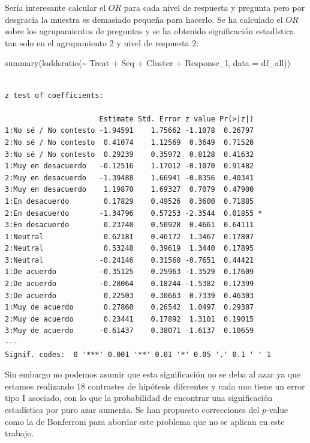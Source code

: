 \documentclass[
  12pt,
  a4paper,
  extrafontsizes,
  onecolumn,
  openright]{memoir}
\newenvironment{Shaded}{\begin{snugshade}}{\end{snugshade}}
\newcommand{\AttributeTok}[1]{\textcolor[rgb]{0.40,0.45,0.13}{#1}}
\newcommand{\FunctionTok}[1]{\textcolor[rgb]{0.28,0.35,0.67}{#1}}
\newcommand{\NormalTok}[1]{\textcolor[rgb]{0.00,0.23,0.31}{#1}}
\newcommand{\SpecialCharTok}[1]{\textcolor[rgb]{0.37,0.37,0.37}{#1}}
\begin{document}
Sería interesante calcular el \(OR\) para cada nivel de respuesta y
pregunta pero por desgracia la muestra es demasiado pequeña para
hacerlo. Se ha calculado el \(OR\) sobre los agrupamientos de preguntas
y se ha obtenido significación estadística tan solo en el agrupamiento 2
y nivel de respuesta 2:

\scriptsize

\begin{Shaded}
\begin{Highlighting}[]
\FunctionTok{summary}\NormalTok{(}\FunctionTok{loddsratio}\NormalTok{(}\SpecialCharTok{\textasciitilde{}}\NormalTok{ Treat }\SpecialCharTok{+}\NormalTok{ Seq }\SpecialCharTok{+}\NormalTok{ Cluster }\SpecialCharTok{+}\NormalTok{ Response\_l, }\AttributeTok{data =}\NormalTok{ df\_all))}
\end{Highlighting}
\end{Shaded}

\begin{verbatim}

z test of coefficients:

                      Estimate Std. Error z value Pr(>|z|)  
1:No sé / No contesto -1.94591    1.75662 -1.1078  0.26797  
2:No sé / No contesto  0.41074    1.12569  0.3649  0.71520  
3:No sé / No contesto  0.29239    0.35972  0.8128  0.41632  
1:Muy en desacuerdo   -0.12516    1.17012 -0.1070  0.91482  
2:Muy en desacuerdo   -1.39488    1.66941 -0.8356  0.40341  
3:Muy en desacuerdo    1.19870    1.69327  0.7079  0.47900  
1:En desacuerdo        0.17829    0.49526  0.3600  0.71885  
2:En desacuerdo       -1.34796    0.57253 -2.3544  0.01855 *
3:En desacuerdo        0.23740    0.50928  0.4661  0.64111  
1:Neutral              0.62181    0.46172  1.3467  0.17807  
2:Neutral              0.53248    0.39619  1.3440  0.17895  
3:Neutral             -0.24146    0.31560 -0.7651  0.44421  
1:De acuerdo          -0.35125    0.25963 -1.3529  0.17609  
2:De acuerdo          -0.28064    0.18244 -1.5382  0.12399  
3:De acuerdo           0.22503    0.30663  0.7339  0.46303  
1:Muy de acuerdo       0.27860    0.26542  1.0497  0.29387  
2:Muy de acuerdo       0.23441    0.17892  1.3101  0.19015  
3:Muy de acuerdo      -0.61437    0.38071 -1.6137  0.10659  
---
Signif. codes:  0 '***' 0.001 '**' 0.01 '*' 0.05 '.' 0.1 ' ' 1
\end{verbatim}

\normalsize

Sin embargo no podemos asumir que esta significación no se deba al azar
ya que estamos realizando 18 contrastes de hipótesis diferentes y cada
uno tiene un error tipo I asociado, con lo que la probabilidad de
encontrar una significación estadística por puro azar aumenta. Se han
propuesto correcciones del \(p\)-value como la de Bonferroni para
abordar este problema que no se aplican en este trabajo.
\end{document}
